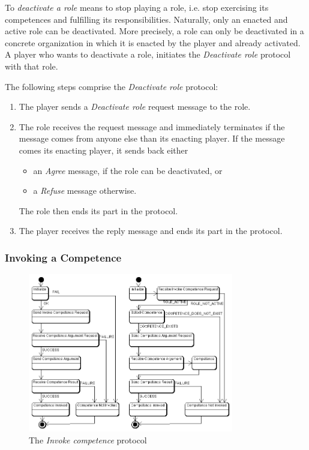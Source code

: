 To \textit{deactivate a role} means to stop playing a role, i.e. stop exercising its competences and fulfilling its responsibilities.
Naturally, only an enacted and active role can be deactivated.
More precisely, a role can only be deactivated in a concrete organization in which it is enacted by the player and already activated.
A player who wants to deactivate a role, initiates the \textit{Deactivate role} protocol with that role.

The following steps comprise the \textit{Deactivate role} protocol:
\begin{enumerate}
	\item The player sends a \textit{Deactivate role} request message to the role.
	\item The role receives the request message and immediately terminates if the message comes from anyone else than its enacting player.
	If the message comes its enacting player, it sends back either
	\begin{itemize}
		\item an \textit{Agree} message, if the role can be deactivated, or
		\item a \textit{Refuse} message otherwise.
	\end{itemize}
	The role then ends its part in the protocol.
	\item The player receives the reply message and ends its part in the protocol.
\end{enumerate}

\subsubsection{Invoking a Competence}

\begin{figure}[ht]
	\centering
	\includegraphics[width=0.8\textwidth]{images/thespian/invoke-competence-protocol}
	\caption{The \textit{Invoke competence} protocol}
	\label{figure:thespian-invoke-competence-protocol}
\end{figure}


